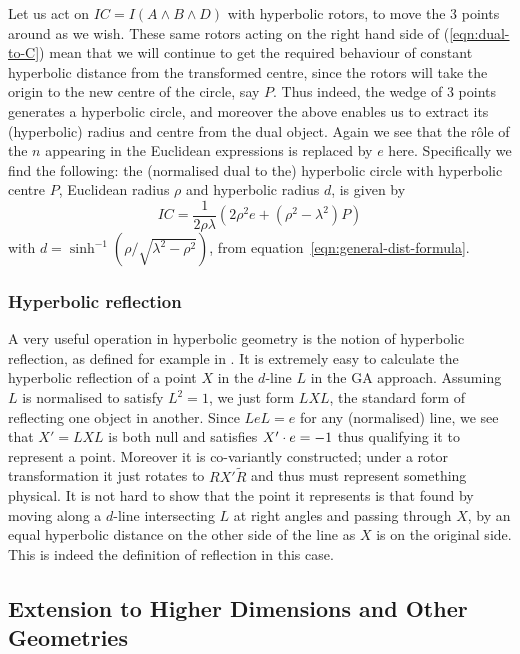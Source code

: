 %
Let us act on $IC=I(A \wedge B \wedge D)$ with hyperbolic rotors,
to move the 3 points around as we wish. These same rotors acting
on the right hand side of (\ref{eqn:dual-to-C}) mean that we will
continue to get the required behaviour of constant hyperbolic
distance from the transformed centre, since the rotors will take
the origin to the new centre of the circle, say $P$. Thus indeed,
the wedge of 3 points generates a hyperbolic circle, and
moreover the above enables us to extract its (hyperbolic)
radius and centre from the dual object. Again we see that the
r\^ole of the $n$ appearing in the Euclidean expressions is
replaced by $e$ here. Specifically we find the following: the
(normalised dual to the) hyperbolic circle with hyperbolic
centre $P$, Euclidean radius $\rho$ and hyperbolic radius $d$,
is given by
%
\begin{equation}\label{eqn:non-e-circle}
IC = \frac{1}{2 \rho \lambda} \left( 2 \rho^2 e +
(\rho^2-\lambda^2) P \right)
\end{equation}
%
with $d= \sinh^{-1} (\rho/\sqrt{\lambda^2-\rho^2})$, from
equation~\ref{eqn:general-dist-formula}.

\subsubsection{Hyperbolic reflection}

A very useful operation in hyperbolic geometry is the notion of
hyperbolic reflection, as defined for example in \cite{GEOM:brannan}. 
It is extremely easy to calculate the hyperbolic
reflection of a point $X$ in the $d$-line $L$ in the GA approach.
Assuming $L$ is normalised to satisfy $L^2=1$, we just form $LXL$,
the standard form of reflecting one object in another. Since $L e
L = e$ for any (normalised) line, we see that $X'=LXL$ is both
null and satisfies $X' \cdot e=-1$ thus qualifying it to represent a
point. Moreover it is co-variantly constructed;
under a rotor transformation it just rotates to $R X'
\tilde{R}$ and thus must represent something physical. It is not
hard to show that the point it represents is that found by moving
along a $d$-line intersecting $L$ at right angles and passing
through $X$, by an equal hyperbolic distance on the other side
of the line as $X$ is on the original side. This is indeed the
definition of reflection in this case.

\subsection{Extension to Higher Dimensions and Other Geometries}

